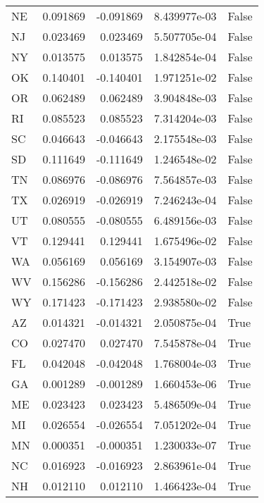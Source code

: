 \begin{table}
\begin{tabular}{lrrrl}
      NE &   0.091869 & -0.091869 &   8.439977e-03 &         False \\
      NJ &   0.023469 &  0.023469 &   5.507705e-04 &         False \\
      NY &   0.013575 &  0.013575 &   1.842854e-04 &         False \\
      OK &   0.140401 & -0.140401 &   1.971251e-02 &         False \\
      OR &   0.062489 &  0.062489 &   3.904848e-03 &         False \\
      RI &   0.085523 &  0.085523 &   7.314204e-03 &         False \\
      SC &   0.046643 & -0.046643 &   2.175548e-03 &         False \\
      SD &   0.111649 & -0.111649 &   1.246548e-02 &         False \\
      TN &   0.086976 & -0.086976 &   7.564857e-03 &         False \\
      TX &   0.026919 & -0.026919 &   7.246243e-04 &         False \\
      UT &   0.080555 & -0.080555 &   6.489156e-03 &         False \\
      VT &   0.129441 &  0.129441 &   1.675496e-02 &         False \\
      WA &   0.056169 &  0.056169 &   3.154907e-03 &         False \\
      WV &   0.156286 & -0.156286 &   2.442518e-02 &         False \\
      WY &   0.171423 & -0.171423 &   2.938580e-02 &         False \\
      AZ &   0.014321 & -0.014321 &   2.050875e-04 &          True \\
      CO &   0.027470 &  0.027470 &   7.545878e-04 &          True \\
      FL &   0.042048 & -0.042048 &   1.768004e-03 &          True \\
      GA &   0.001289 & -0.001289 &   1.660453e-06 &          True \\
      ME &   0.023423 &  0.023423 &   5.486509e-04 &          True \\
      MI &   0.026554 & -0.026554 &   7.051202e-04 &          True \\
      MN &   0.000351 & -0.000351 &   1.230033e-07 &          True \\
      NC &   0.016923 & -0.016923 &   2.863961e-04 &          True \\
      NH &   0.012110 &  0.012110 &   1.466423e-04 &          True \\

\end{tabular}
\end{table}
